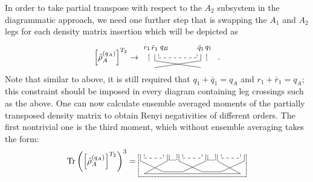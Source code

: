 \documentclass[aps,pra,reprint,superscriptaddress,twocolumn,notitlepage]{revtex4-1}
\newcommand{\Tr}{\text{Tr}}
\numberwithin{equation}{section}
\begin{document}
In order to take partial transpose with respect to the $A_2$ subsystem in the diagrammatic approach,
we need one further step that is swapping the $A_1$ and $A_2$ legs for each density matrix insertion which will be depicted as
\begin{equation}
    \left[ \hat\rho_{A}^{(q_A)} \right]^{T_2} \to 
    \tikz[scale=0.8,baseline=-0.5ex]{
    \draw[dashed] (0.,0.2)-- (0,0);
    \draw[dashed] (0,0) -- (2,0);
    \draw[dashed]  (2,0.2) -- (2,0);
    \draw (-0.2,0.2)-- (-0.2,-0.15) -- (2.2,-0.5);
    \draw (2.2,0.2) -- (2.2,-0.15) -- (-0.2 , -0.5);
    \draw[densely dotted,thick] (-0.5,0.2)-- (-0.5,-0.15);
    \draw[densely dotted,thick] (2.5,-0.15)-- (2.5,0.2);
    \draw (-0.6,0.5) circle (0.) node[anchor=center] {\footnotesize$r_1$};
    \draw (-0.2,0.5) circle (0.) node[anchor=center] {\footnotesize$\bar{r}_1$};
    \draw (2.2,0.5) circle (0.) node[anchor=center] {\footnotesize$\bar{q}_1$};
    \draw (2.6,0.5) circle (0.) node[anchor=center] {\footnotesize$q_1$};
    \draw (0.3,0.5) circle (0.) node[anchor=center] {\footnotesize$ q_B $};
    }\ .
\end{equation}
Note that similar to above, it is still required that $q_1+\bar{q}_1 = q_A$ and $r_1+\bar{r}_1 = q_A$; this constraint should be imposed in every diagram containing leg crossings such as the above. One can now calculate ensemble averaged moments of the partially transposed density matrix to obtain Renyi negativities of different orders. The  first nontrivial one is the third moment, which without ensemble averaging takes the form:
\begin{equation}
\Tr  \left( \left[ \hat\rho_{A}^{(q_A)} \right]^{T_2} \right)^3
=
    \tikz[scale=0.8,baseline=-1.5ex]{
    \draw[dashed] (0,0.2)-- (0,0);
    \draw[dashed] (0,0) -- (1,0);
    \draw[dashed]  (1,0.2) -- (1,0);
    \draw (-0.2,0.2)-- (-0.2,-0.15);
    \draw (-0.2,-0.15)-- (1.,-0.7);
    \draw (1.2,-0.15)-- (1.2,0.2);
    \draw (1.2,-0.15)-- (0,-0.8);
    \draw[densely dotted,thick] (-0.3,0.2)-- (-0.3,-0.95);
    \draw[densely dotted,thick] (1.3,-0.1)-- (1.3,0.2);
    \draw[dashed] (2,0.2)-- (2,0);
    \draw[dashed] (2,0) -- (3,0);
    \draw[dashed]  (3,0.2) -- (3,0);
    \draw (1.8,0.2)-- (1.8,-0.15);
    \draw (1.8,-0.15)-- (3.,-0.7);
    \draw (3.2,-0.15)-- (3.2,0.2);
    \draw (3.2,-0.15)-- (2,-0.7);
    \draw[densely dotted,thick] (1.7,0.2)-- (1.7,-0.1);
    \draw[densely dotted,thick] (3.3,-0.1)-- (3.3,0.2);
    \draw[dashed] (4,0.2)-- (4,0);
    \draw[dashed] (4,0) -- (5,0);
    \draw[dashed]  (5,0.2) -- (5,0);
    \draw (3.8,0.2)-- (3.8,-0.15);
    \draw (3.8,-0.15)-- (5.,-0.8);
    \draw (5.2,-0.15)-- (5.2,0.2);
    \draw (5.2,-0.15)-- (4,-0.7);
    \draw[densely dotted,thick] (3.7,0.2)-- (3.7,-0.1);
    \draw[densely dotted,thick] (5.3,-0.95)-- (5.3,0.2);
    \draw[densely dotted,thick] (1.3,-0.1)--(1.7,-0.1);
    \draw[densely dotted,thick](3.3,-0.1)--(3.7,-0.1);
    \draw[densely dotted,thick](-0.3,-0.95)--(5.3,-0.95);
    \draw (3,-0.7)--(4.,-0.7);
    \draw (0,-0.8)--(5.,-0.8);
    \draw (1.0,-0.7)-- (2,-0.7);
    }
\end{equation}
\end{document}
